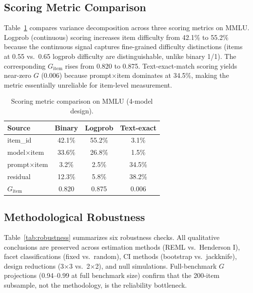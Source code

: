 \documentclass[11pt]{article}
\begin{document}
\subsection{Scoring Metric Comparison}

Table~\ref{tab:scoring} compares variance decomposition across three scoring metrics on MMLU.
Logprob (continuous) scoring increases item difficulty from 42.1\% to 55.2\% because the continuous signal captures fine-grained difficulty distinctions (items at 0.55 vs.\ 0.65 logprob difficulty are distinguishable, unlike binary 1/1).
The corresponding $G_{\text{item}}$ rises from 0.820 to 0.875.
Text-exact-match scoring yields near-zero $G$ (0.006) because prompt$\times$item dominates at 34.5\%, making the metric essentially unreliable for item-level measurement.

\begin{table}[t]
\centering
\caption{Scoring metric comparison on MMLU (4-model design).}
\label{tab:scoring}
\small
\begin{tabular}{@{}lccc@{}}
\toprule
Source & Binary & Logprob & Text-exact \\
\midrule
item\_id         & 42.1\% & 55.2\% &  3.1\% \\
model$\times$item & 33.6\% & 26.8\% &  1.5\% \\
prompt$\times$item &  3.2\% &  2.5\% & 34.5\% \\
residual         & 12.3\% &  5.8\% & 38.2\% \\
\midrule
$G_{\text{item}}$ & 0.820 & 0.875 & 0.006 \\
\bottomrule
\end{tabular}
\end{table}

\subsection{Methodological Robustness}

Table~\ref{tab:robustness} summarizes six robustness checks.
All qualitative conclusions are preserved across estimation methods (REML vs.\ Henderson I), facet classifications (fixed vs.\ random), CI methods (bootstrap vs.\ jackknife), design reductions (3$\times$3 vs.\ 2$\times$2), and null simulations.
Full-benchmark $G$ projections (0.94--0.99 at full benchmark size) confirm that the 200-item subsample, not the methodology, is the reliability bottleneck.
\end{document}
